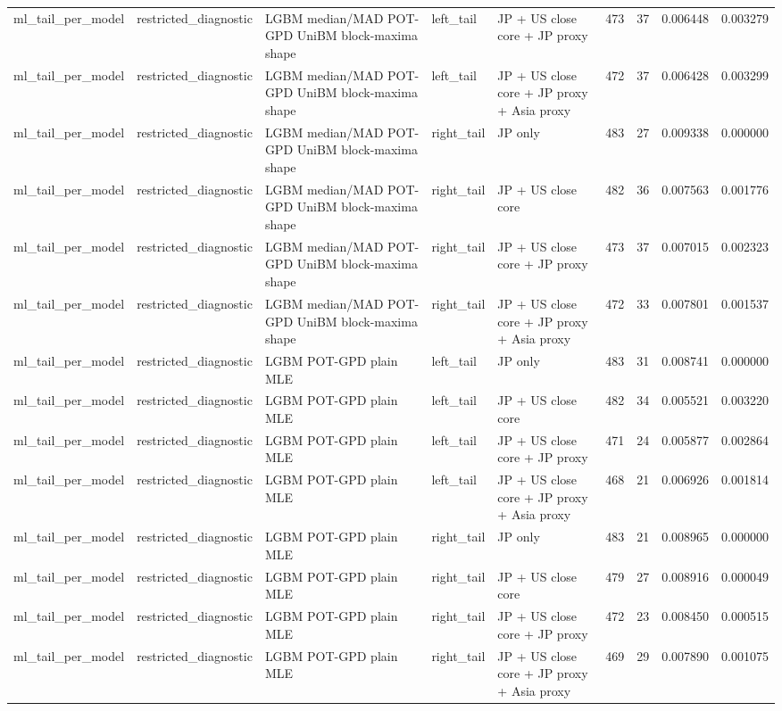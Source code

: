 \begin{tabular}{lllllrrrr}
ml\_tail\_per\_model & restricted\_diagnostic & LGBM median/MAD POT-GPD UniBM block-maxima shape & left\_tail & JP + US close core + JP proxy & 473 & 37 & 0.006448 & 0.003279 \\
ml\_tail\_per\_model & restricted\_diagnostic & LGBM median/MAD POT-GPD UniBM block-maxima shape & left\_tail & JP + US close core + JP proxy + Asia proxy & 472 & 37 & 0.006428 & 0.003299 \\
ml\_tail\_per\_model & restricted\_diagnostic & LGBM median/MAD POT-GPD UniBM block-maxima shape & right\_tail & JP only & 483 & 27 & 0.009338 & 0.000000 \\
ml\_tail\_per\_model & restricted\_diagnostic & LGBM median/MAD POT-GPD UniBM block-maxima shape & right\_tail & JP + US close core & 482 & 36 & 0.007563 & 0.001776 \\
ml\_tail\_per\_model & restricted\_diagnostic & LGBM median/MAD POT-GPD UniBM block-maxima shape & right\_tail & JP + US close core + JP proxy & 473 & 37 & 0.007015 & 0.002323 \\
ml\_tail\_per\_model & restricted\_diagnostic & LGBM median/MAD POT-GPD UniBM block-maxima shape & right\_tail & JP + US close core + JP proxy + Asia proxy & 472 & 33 & 0.007801 & 0.001537 \\
ml\_tail\_per\_model & restricted\_diagnostic & LGBM POT-GPD plain MLE & left\_tail & JP only & 483 & 31 & 0.008741 & 0.000000 \\
ml\_tail\_per\_model & restricted\_diagnostic & LGBM POT-GPD plain MLE & left\_tail & JP + US close core & 482 & 34 & 0.005521 & 0.003220 \\
ml\_tail\_per\_model & restricted\_diagnostic & LGBM POT-GPD plain MLE & left\_tail & JP + US close core + JP proxy & 471 & 24 & 0.005877 & 0.002864 \\
ml\_tail\_per\_model & restricted\_diagnostic & LGBM POT-GPD plain MLE & left\_tail & JP + US close core + JP proxy + Asia proxy & 468 & 21 & 0.006926 & 0.001814 \\
ml\_tail\_per\_model & restricted\_diagnostic & LGBM POT-GPD plain MLE & right\_tail & JP only & 483 & 21 & 0.008965 & 0.000000 \\
ml\_tail\_per\_model & restricted\_diagnostic & LGBM POT-GPD plain MLE & right\_tail & JP + US close core & 479 & 27 & 0.008916 & 0.000049 \\
ml\_tail\_per\_model & restricted\_diagnostic & LGBM POT-GPD plain MLE & right\_tail & JP + US close core + JP proxy & 472 & 23 & 0.008450 & 0.000515 \\
ml\_tail\_per\_model & restricted\_diagnostic & LGBM POT-GPD plain MLE & right\_tail & JP + US close core + JP proxy + Asia proxy & 469 & 29 & 0.007890 & 0.001075 \\

\end{tabular}
